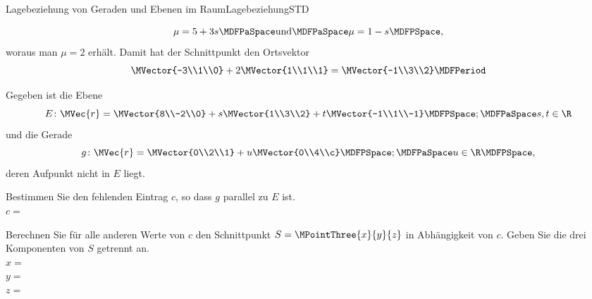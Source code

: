 \begin{MXContent}{Lagebeziehung von Geraden und Ebenen im Raum}{Lagebeziehung}{STD}
\begin{MExample}
\begin{itemize}
 \[
  \mu=5+3s\MDFPaSpace\textrm{und}\MDFPaSpace \mu=1-s \MDFPSpace,
 \]
 woraus man $\mu=2$ erhält. Damit hat der Schnittpunkt den Ortsvektor
 \[
  \MVector{-3\\1\\0}+2\MVector{1\\1\\1}=\MVector{-1\\3\\2} \MDFPeriod
 \]
\end{itemize}
\end{MExample}

\begin{MExercise}
Gegeben ist die Ebene
\[
 E\colon\MVec{r}=\MVector{8\\-2\\0}+s\MVector{1\\3\\2}+t\MVector{-1\\1\\-1}\MDFPSpace;\MDFPaSpace s,t\in\R
\]
und die Gerade 
\[
 g\colon \MVec{r}=\MVector{0\\2\\1}+u\MVector{0\\4\\c}\MDFPSpace;\MDFPaSpace u\in\R \MDFPSpace,
\]
deren Aufpunkt nicht in $E$ liegt.

Bestimmen Sie den fehlenden Eintrag $c$, so dass $g$ parallel zu $E$ ist.\\
$c=$

Berechnen Sie für alle anderen Werte von $c$ den Schnittpunkt $S=\MPointThree{x}{y}{z}$ in Abhängigkeit von $c$. Geben Sie die drei Komponenten von $S$ getrennt an.\\
$x=$\\
$y=$\\
$z=$


\end{MExercise}
\end{MXContent}
